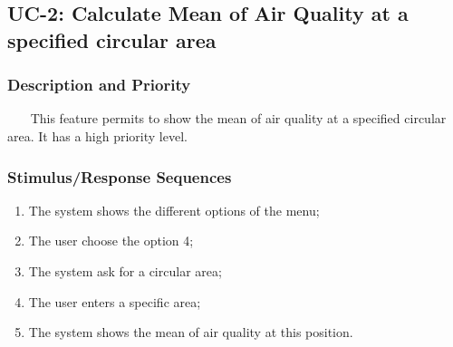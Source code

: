\documentclass{report}
\begin{document}



\subsection{UC-2: Calculate Mean of Air Quality at a specified circular area}

\subsubsection*{Description and Priority} ~~~
This feature permits to show the mean of air quality at a specified circular
area. It has a high priority level.

\subsubsection*{Stimulus/Response Sequences}
\begin{enumerate}
	\item The system shows the different options of the menu;
	\item The user choose the option 4;
	\item The system ask for a circular area;
	\item The user enters a specific area;
	\item The system shows the mean of air quality at this position.
\end{enumerate}
\end{document}
